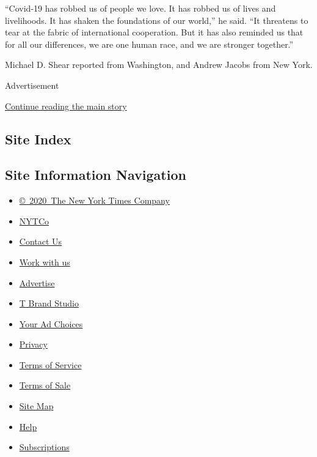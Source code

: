``Covid-19 has robbed us of people we love. It has robbed us of lives
and livelihoods. It has shaken the foundations of our world,'' he said.
``It threatens to tear at the fabric of international cooperation. But
it has also reminded us that for all our differences, we are one human
race, and we are stronger together.''

Michael D. Shear reported from Washington, and Andrew Jacobs from New
York.

Advertisement

\protect\hyperlink{after-bottom}{Continue reading the main story}

\hypertarget{site-index}{%
\subsection{Site Index}\label{site-index}}

\hypertarget{site-information-navigation}{%
\subsection{Site Information
Navigation}\label{site-information-navigation}}

\begin{itemize}
\tightlist
\item
  \href{https://help.nytimes3xbfgragh.onion/hc/en-us/articles/115014792127-Copyright-notice}{©~2020~The
  New York Times Company}
\end{itemize}

\begin{itemize}
\tightlist
\item
  \href{https://www.nytco.com/}{NYTCo}
\item
  \href{https://help.nytimes3xbfgragh.onion/hc/en-us/articles/115015385887-Contact-Us}{Contact
  Us}
\item
  \href{https://www.nytco.com/careers/}{Work with us}
\item
  \href{https://nytmediakit.com/}{Advertise}
\item
  \href{http://www.tbrandstudio.com/}{T Brand Studio}
\item
  \href{https://www.nytimes3xbfgragh.onion/privacy/cookie-policy\#how-do-i-manage-trackers}{Your
  Ad Choices}
\item
  \href{https://www.nytimes3xbfgragh.onion/privacy}{Privacy}
\item
  \href{https://help.nytimes3xbfgragh.onion/hc/en-us/articles/115014893428-Terms-of-service}{Terms
  of Service}
\item
  \href{https://help.nytimes3xbfgragh.onion/hc/en-us/articles/115014893968-Terms-of-sale}{Terms
  of Sale}
\item
  \href{https://spiderbites.nytimes3xbfgragh.onion}{Site Map}
\item
  \href{https://help.nytimes3xbfgragh.onion/hc/en-us}{Help}
\item
  \href{https://www.nytimes3xbfgragh.onion/subscription?campaignId=37WXW}{Subscriptions}
\end{itemize}
